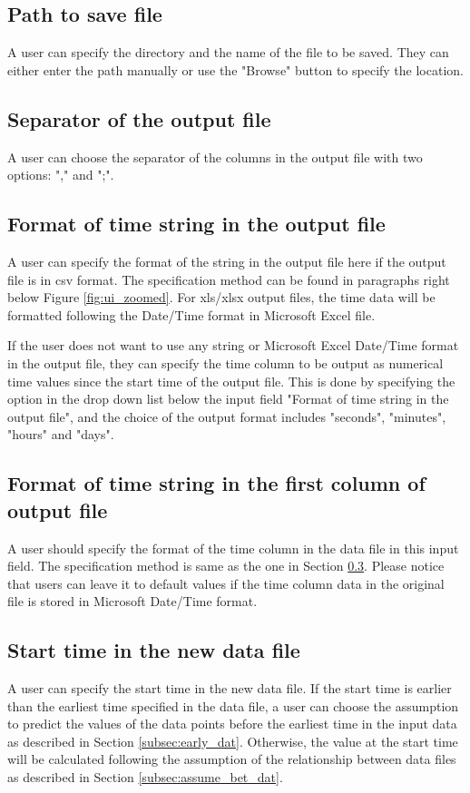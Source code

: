 \documentclass[12pt,a4paper]{article}
\begin{document}
\subsection{Path to save file}
A user can specify the directory and the name of the file to be saved.
They can either enter the path manually or use the "Browse" button to specify the location.

\subsection{Separator of the output file}
A user can choose the separator of the columns in the output file with two options: "," and ";".

\subsection{Format of time string in the output file}
\label{subsec:format_time_output}
A user can specify the format of the string in the output file here if the output file is in csv format.
The specification method can be found in paragraphs right below Figure \ref{fig:ui_zoomed}.
For xls/xlsx output files, the time data will be formatted following the Date/Time format in Microsoft Excel file.

If the user does not want to use any string or Microsoft Excel Date/Time format in the output file, they can specify the time column to be output as numerical time values since the start time of the output file.
This is done by specifying the option in the drop down list below the input field "Format of time string in the output file", and the choice of the output format includes "seconds", "minutes", "hours" and "days".

\subsection{Format of time string in the first column of output file}
A user should specify the format of the time column in the data file in this input field. The specification method is same as the one in Section \ref{subsec:format_time_output}.
Please notice that users can leave it to default values if the time column data in the original file is stored in Microsoft Date/Time format.

\subsection{Start time in the new data file}
A user can specify the start time in the new data file.
If the start time is earlier than the earliest time specified in the data file, a user can choose the assumption to predict the values of the data points before the earliest time in the input data as described in Section \ref{subsec:early_dat}.
Otherwise, the value at the start time will be calculated following the assumption of the relationship between data files as described in Section \ref{subsec:assume_bet_dat}.
\end{document}
